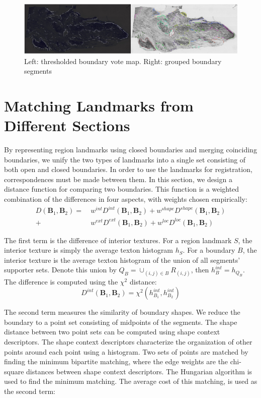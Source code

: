 \documentclass{llncs}
\begin{document}
\begin{figure}
	\includegraphics[width=\textwidth]{../figures/BoundariesThreshAndGroupedHorizontal.png}
	\caption{Left: thresholded boundary vote map. Right: grouped boundary segments}
	\label{fig:BoundaryMap}
\end{figure}


\section{Matching Landmarks from Different Sections}

By representing region landmarks using closed boundaries and merging coinciding boundaries, we unify the two types of landmarks into a single set consisting of both open and closed boundaries. In order to use the landmarks for registration, correspondences must be made between them. In this section, we design a distance function for comparing two boundaries. This function is a weighted combination of the differences in four aspects, with weights chosen empirically:
\begin{align*}
D(\mathbf{B}_1, \mathbf{B}_2) = & ~w^{int} D^{int}(\mathbf{B}_1, \mathbf{B}_2) + w^{shape} D^{shape}(\mathbf{B}_1, \mathbf{B}_2)  \\
+ & ~w^{ext} D^{ext}(\mathbf{B}_1, \mathbf{B}_2) 
+ w^{loc} D^{loc}(\mathbf{B}_1, \mathbf{B}_2) 
\end{align*}

The first term is the difference of interior textures. For a region landmark $S$, the interior texture is simply the average texton histogram $h_S$. For a boundary $B$, the interior texture is the average texton histogram of the union of all segments' supporter sets. Denote this union by $Q_B = \cup_{(i,j)\in B} R_{(i,j)}$, then $h^{int}_B = h_{Q_B}$. The difference is computed using the $\chi^2$ distance:
$$D^{int}(\mathbf{B}_1, \mathbf{B}_2) = \chi^2(h^{int}_{B_1}, h^{int}_{B_2})$$

The second term measures the similarity of boundary shapes. We reduce the boundary to a point set consisting of midpoints of the segments. The shape distance between two point sets can be computed using shape context descriptors\cite{belongie2000shape}. The shape context descriptors characterize the organization of other points around each point using a histogram. Two sets of points are matched by finding the minimum bipartite matching, where the edge weights are the chi-square distances between shape context descriptors. The Hungarian algorithm is used to find the minimum matching. The average cost of this matching, is used as the second term:
\end{document}
